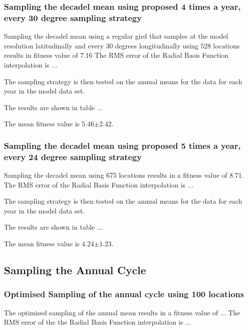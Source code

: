 \documentclass[11pt, a4paper]{article}
\numberwithin{figure}{section}
\numberwithin{table}{section}
\begin{document}
\subsubsection{Sampling the decadel mean using proposed 4 times a year, every 30 degree sampling strategy}
Sampling the decadel mean using a regular gird that samples at the model 
resolution latitudinally and every 30 degrees longitudinally using 528 locations results in fitness
value of 7.16
The RMS error of the Radial Basis Function interpolation is ...

The sampling strategy is then tested on the annual means for the data
for each year in the model data set.

The results are shown in table ...

The mean fitness value is 5.46$\pm$2.42.



\subsubsection{Sampling the decadel mean using proposed 5 times a year, every 24 degree sampling strategy}
Sampling the decadel mean using 675 locations results in a fitness
value of 8.71.
The RMS error of the Radial Basis Function interpolation is ...

The sampling strategy is then tested on the annual means for the data
for each year in the model data set.

The results are shown in table ...

The mean fitness value is 4.24$\pm$1.23.



\subsection{Sampling the Annual Cycle}

\subsubsection{Optimised Sampling of the annual cycle using 100 locations}
The optimised sampling of the annual mean results in a fitness value
of ...
The RMS error of the the Radial Basis Function interpolation is ...
\end{document}
